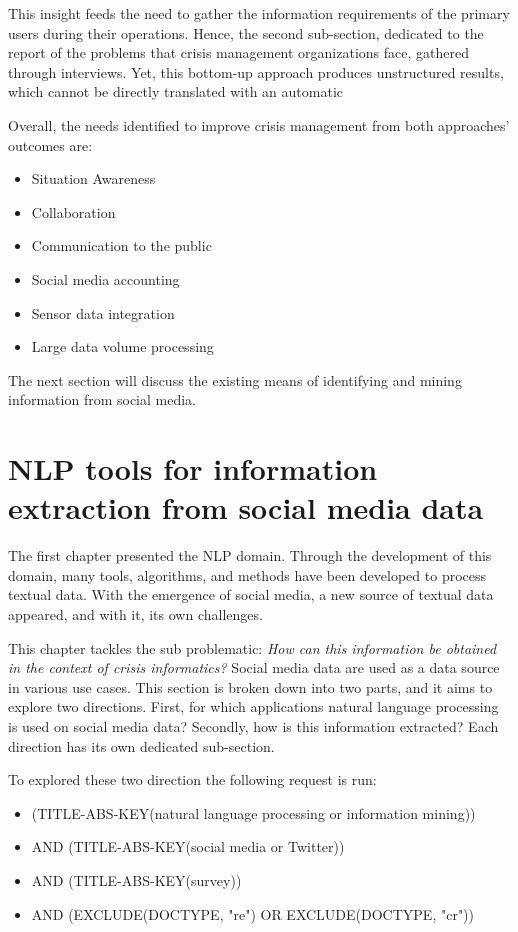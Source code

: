 This insight feeds the need to gather the information requirements of the primary users during their operations.
Hence, the second sub-section, dedicated to the report of the problems that crisis management organizations face, gathered through interviews.
Yet, this bottom-up approach produces unstructured results, which cannot be directly translated with an automatic

Overall, the needs identified to improve crisis management from both approaches' outcomes are:

\begin{itemize}
    \item Situation Awareness
    \item Collaboration
    \item Communication to the public
    \item Social media accounting
    \item Sensor data integration
    \item Large data volume processing
\end{itemize}

The next section will discuss the existing means of identifying and mining information from social media.

\section{NLP tools for information extraction from social media data}
The first chapter presented the NLP domain.
Through the development of this domain, many tools, algorithms, and methods have been developed to process textual data.
With the emergence of social media, a new source of textual data appeared, and with it, its own challenges.

This chapter tackles the sub problematic: \emph{How can this information be obtained in the context of crisis informatics?}
Social media data are used as a data source in various use cases.
This section is broken down into two parts, and it aims to explore two directions.
First, for which applications natural language processing is used on social media data?
Secondly, how is this information extracted?
Each direction has its own dedicated sub-section.

To explored these two direction the following request is run:

\begin{itemize}
    \item (TITLE-ABS-KEY({natural language processing} or {information mining}))
    \item AND (TITLE-ABS-KEY({social media} or Twitter))
    \item AND (TITLE-ABS-KEY(survey))
    \item AND (EXCLUDE(DOCTYPE, "re") OR EXCLUDE(DOCTYPE, "cr"))
\end{itemize}

